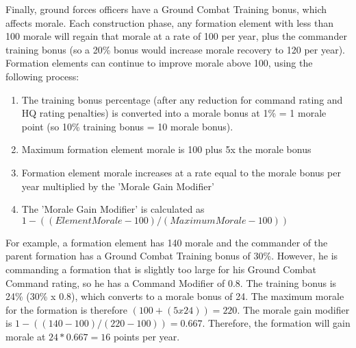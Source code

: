 \documentclass[../../Aurora C# unofficial manual.tex]{subfiles}
\begin{document}
	Finally, ground forces officers have a Ground Combat Training bonus, which affects morale. Each construction phase, any formation element with less than 100 morale will regain that morale at a rate of 100 per year, plus the commander training bonus (so a 20\% bonus would increase morale recovery to 120 per year). Formation elements can continue to improve morale above 100, using the following process:
	\begin{enumerate}
		\item The training bonus percentage (after any reduction for command rating and HQ rating penalties) is converted into a morale bonus at 1\% = 1 morale point (so 10\% training bonus = 10 morale bonus).
		\item Maximum formation element morale is 100 plus 5x the morale bonus
		\item Formation element morale increases at a rate equal to the morale bonus per year multiplied by the 'Morale Gain Modifier'
		\item The 'Morale Gain Modifier' is calculated as \( 1 - ((Element Morale - 100) / (Maximum Morale - 100)) \)
	\end{enumerate}

	For example, a formation element has 140 morale and the commander of the parent formation has a Ground Combat Training bonus of 30\%. However, he is commanding a formation that is slightly too large for his Ground Combat Command rating, so he has a Command Modifier of 0.8. The training bonus is 24\% (30\% x 0.8), which converts to a morale bonus of 24. The maximum morale for the formation is therefore \( (100 + (5 x 24)) = 220 \). The morale gain modifier is \( 1 - ((140-100) / (220 - 100)) = 0.667 \). Therefore, the formation will gain morale at \( 24 * 0.667 = 16 \) points per year.
\end{document}
